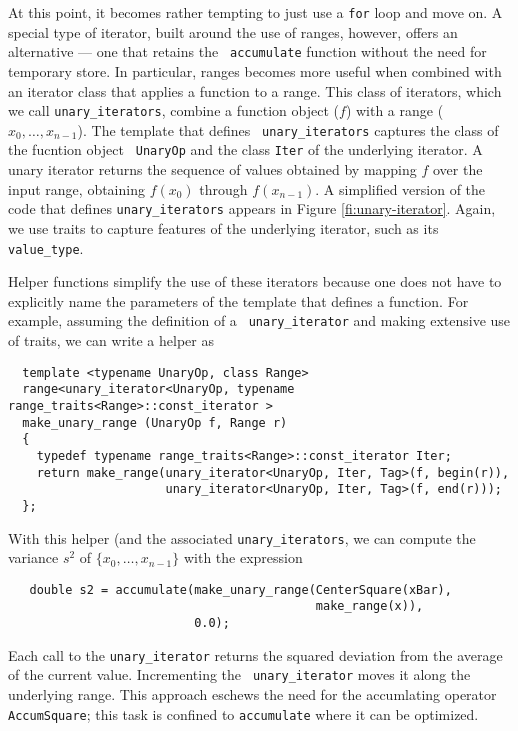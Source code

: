 \documentclass[12pt]{article}
\begin{document}
  At this point, it becomes rather tempting to just use a {\tt for} loop
and move on.  A special type of iterator, built around the use of
ranges, however, offers an alternative --- one that retains the {\tt
accumulate} function without the need for temporary store.  In
particular, ranges becomes more useful when combined with an iterator
class that applies a function to a range.  This class of iterators,
which we call {\tt unary\_iterators}, combine a function object ($f$)
with a range ($x_0,\ldots,x_{n-1}$).  The template that defines {\tt
unary\_iterators} captures the class of the fucntion object {\tt
UnaryOp} and the class {\tt Iter} of the underlying iterator.  A unary
iterator returns the sequence of values obtained by mapping $f$ over
the input range, obtaining $f(x_0)$ through $f(x_{n-1})$.  A
simplified version of the code that defines {\tt unary\_iterators}
appears in Figure \ref{fi:unary-iterator}.  Again, we use traits to
capture features of the underlying iterator, such as its {\tt
value\_type}.


  Helper functions simplify the use of these iterators because one
does not have to explicitly name the parameters of the template that
defines a function. For example, assuming the definition of a {\tt
unary\_iterator} and making extensive use of traits, we can write a
helper as
\begin{verbatim}
  template <typename UnaryOp, class Range>
  range<unary_iterator<UnaryOp, typename range_traits<Range>::const_iterator >
  make_unary_range (UnaryOp f, Range r)
  {
    typedef typename range_traits<Range>::const_iterator Iter;
    return make_range(unary_iterator<UnaryOp, Iter, Tag>(f, begin(r)),
                      unary_iterator<UnaryOp, Iter, Tag>(f, end(r)));
  };
\end{verbatim}
With this helper (and the associated {\tt unary\_iterators}, we can
compute the variance $s^2$ of $\{x_0,\ldots,x_{n-1}\}$ with the
expression
\begin{verbatim}
   double s2 = accumulate(make_unary_range(CenterSquare(xBar),
                                           make_range(x)),
                          0.0);
\end{verbatim}
Each call to the {\tt unary\_iterator} returns the squared deviation
from the average of the current value. Incrementing the {\tt
unary\_iterator} moves it along the underlying range. This approach
eschews the need for the accumlating operator {\tt AccumSquare};
this task is confined to {\tt accumulate} where it can be optimized.
\end{document}
